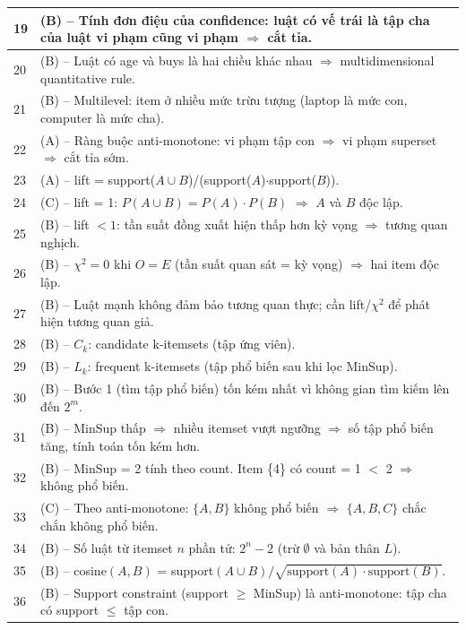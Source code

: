 \documentclass[10pt]{article}
\begin{document}
\begin{singlespace}
\begin{longtable}{|p{}|p{}|}
\hline
19 & (B) -- Tính đơn điệu của confidence: luật có vế trái là tập cha của luật vi phạm cũng vi phạm $\Rightarrow$ cắt tỉa. \\
\hline
20 & (B) -- Luật có age và buys là hai chiều khác nhau $\Rightarrow$ multidimensional quantitative rule. \\
\hline
21 & (B) -- Multilevel: item ở nhiều mức trừu tượng (laptop là mức con, computer là mức cha). \\
\hline
22 & (A) -- Ràng buộc anti-monotone: vi phạm tập con $\Rightarrow$ vi phạm superset $\Rightarrow$ cắt tỉa sớm. \\
\hline
23 & (A) -- lift = support($A \cup B$)/(support($A$)$\cdot$support($B$)). \\
\hline
24 & (C) -- lift = 1: $P(A \cup B) = P(A) \cdot P(B)$ $\Rightarrow$ $A$ và $B$ độc lập. \\
\hline
25 & (B) -- lift $< 1$: tần suất đồng xuất hiện thấp hơn kỳ vọng $\Rightarrow$ tương quan nghịch. \\
\hline
26 & (B) -- $\chi^2 = 0$ khi $O = E$ (tần suất quan sát = kỳ vọng) $\Rightarrow$ hai item độc lập. \\
\hline
27 & (B) -- Luật mạnh không đảm bảo tương quan thực; cần lift/$\chi^2$ để phát hiện tương quan giả. \\
\hline
28 & (B) -- $C_k$: candidate k-itemsets (tập ứng viên). \\
\hline
29 & (B) -- $L_k$: frequent k-itemsets (tập phổ biến sau khi lọc MinSup). \\
\hline
30 & (B) -- Bước 1 (tìm tập phổ biến) tốn kém nhất vì không gian tìm kiếm lên đến $2^m$. \\
\hline
31 & (B) -- MinSup thấp $\Rightarrow$ nhiều itemset vượt ngưỡng $\Rightarrow$ số tập phổ biến tăng, tính toán tốn kém hơn. \\
\hline
32 & (B) -- MinSup = 2 tính theo count. Item \{4\} có count = 1 $<$ 2 $\Rightarrow$ không phổ biến. \\
\hline
33 & (C) -- Theo anti-monotone: $\{A,B\}$ không phổ biến $\Rightarrow$ $\{A,B,C\}$ chắc chắn không phổ biến. \\
\hline
34 & (B) -- Số luật từ itemset $n$ phần tử: $2^n - 2$ (trừ $\emptyset$ và bản thân $L$). \\
\hline
35 & (B) -- cosine$(A,B)$ = support$(A \cup B)/\sqrt{\text{support}(A) \cdot \text{support}(B)}$. \\
\hline
36 & (B) -- Support constraint (support $\geq$ MinSup) là anti-monotone: tập cha có support $\leq$ tập con. \\

\end{longtable}
\end{singlespace}
\end{document}
